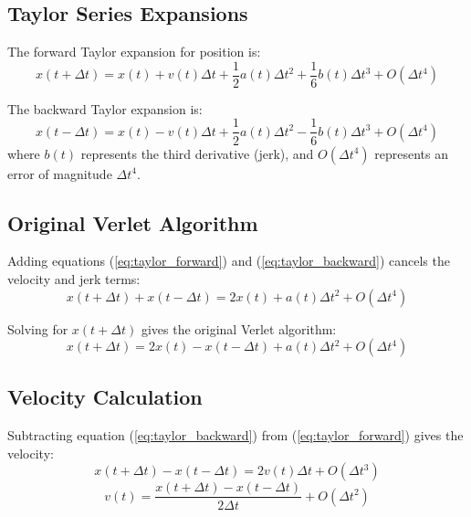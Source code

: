 \subsection{Taylor Series Expansions}

The forward Taylor expansion for position is:
\begin{equation}
    x(t+\Delta t) = x(t) + v(t)\Delta t + \frac{1}{2}a(t)\Delta t^2 + \frac{1}{6}b(t)\Delta t^3 + O(\Delta t^4)
    \label{eq:taylor_forward}
\end{equation}

The backward Taylor expansion is:
\begin{equation}
    x(t-\Delta t) = x(t) - v(t)\Delta t + \frac{1}{2}a(t)\Delta t^2 - \frac{1}{6}b(t)\Delta t^3 + O(\Delta t^4)
    \label{eq:taylor_backward}
\end{equation}
where $b(t)$ represents the third derivative (jerk), and $O(\Delta t^4)$ represents an error of magnitude $\Delta t^4$.

\subsection{Original Verlet Algorithm}

Adding equations (\ref{eq:taylor_forward}) and (\ref{eq:taylor_backward}) cancels the velocity and jerk terms:
\begin{equation}
    x(t+\Delta t) + x(t-\Delta t) = 2x(t) + a(t)\Delta t^2 + O(\Delta t^4)
\end{equation}

Solving for $x(t+\Delta t)$ gives the original Verlet algorithm:
\begin{equation}
    x(t+\Delta t) = 2x(t) - x(t-\Delta t) + a(t)\Delta t^2 + O(\Delta t^4)
    \label{eq:verlet_original}
\end{equation}

\subsection{Velocity Calculation}

Subtracting equation (\ref{eq:taylor_backward}) from (\ref{eq:taylor_forward}) gives the velocity:
\begin{equation}
    x(t+\Delta t) - x(t-\Delta t) = 2v(t)\Delta t + O(\Delta t^3)
\end{equation}
\begin{equation}
    v(t) = \frac{x(t+\Delta t) - x(t-\Delta t)}{2\Delta t} + O(\Delta t^2)
    \label{eq:verlet_velocity}
\end{equation}


